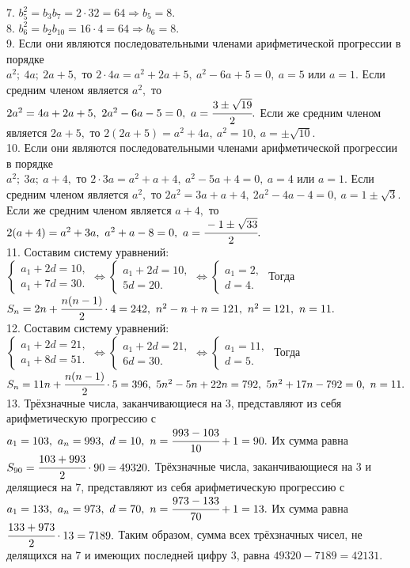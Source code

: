\documentclass[12pt]{article}
\begin{document}
7. $b_5^2=b_3b_7=2\cdot32=64\Rightarrow b_5=8.$\\
8. $b_6^2=b_2b_{10}=16\cdot4=64\Rightarrow b_6=8.$\\
9. Если они являются последовательными членами арифметической прогрессии в порядке\\ $a^2;\ 4a;\ 2a+5,$ то $2\cdot4a=a^2+2a+5,\ a^2-6a+5=0,\ a=5$ или $a=1.$ Если средним членом является $a^2,$ то $2a^2=4a+2a+5,\ 2a^2-6a-5=0,\ a=\cfrac{3\pm\sqrt{19}}{2}.$ Если же средним членом является $2a+5,$ то $2(2a+5)=a^2+4a,\ a^2=10,\ a=\pm\sqrt{10}.$\\
10. Если они являются последовательными членами арифметической прогрессии в порядке\\ $a^2;\ 3a;\ a+4,$ то $2\cdot3a=a^2+a+4,\ a^2-5a+4=0,\ a=4$ или $a=1.$ Если средним членом является $a^2,$ то $2a^2=3a+a+4,\ 2a^2-4a-4=0,\ a=1\pm\sqrt{3}.$ Если же средним членом является $a+4,$ то $2(a+4)=a^2+3a,\ a^2+a-8=0,\ a=\cfrac{-1\pm\sqrt{33}}{2}.$\\
11. Составим систему уравнений: $\begin{cases}a_1+2d=10,\\a_1+7d=30.\end{cases}\Leftrightarrow\begin{cases}a_1+2d=10,\\5d=20.\end{cases}
\Leftrightarrow\begin{cases}a_1=2,\\d=4.\end{cases}$ Тогда $S_n=2n+\cfrac{n(n-1)}{2}\cdot4=242,\ n^2-n+n=121,\ n^2=121,\ n=11.$\\
12. Составим систему уравнений: $\begin{cases}a_1+2d=21,\\a_1+8d=51.\end{cases}\Leftrightarrow\begin{cases}a_1+2d=21,\\6d=30.\end{cases}
\Leftrightarrow\begin{cases}a_1=11,\\d=5.\end{cases}$ Тогда $S_n=11n+\cfrac{n(n-1)}{2}\cdot5=396,\ 5n^2-5n+22n=792,\ 5n^2+17n-792=0,\ n=11.$\\
13. Трёхзначные числа, заканчивающиеся на 3, представляют из себя арифметическую прогрессию с $a_1=103,\ a_n=993,\ d=10,\ n=\cfrac{993-103}{10}+1=90.$ Их сумма равна $S_{90}=\cfrac{103+993}{2}\cdot90=49320.$ Трёхзначные числа, заканчивающиеся на 3 и делящиеся на 7, представляют из себя арифметическую прогрессию с $a_1=133,\ a_n=973,\ d=70,\ n=\cfrac{973-133}{70}+1=13.$ Их сумма равна $\cfrac{133+973}{2}\cdot13=7189.$ Таким образом, сумма всех трёхзначных чисел, не делящихся на 7 и имеющих последней цифру 3, равна $49320-7189=42131.$\\
\end{document}
